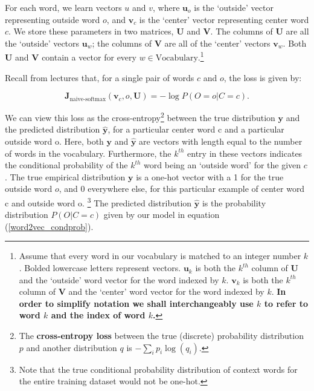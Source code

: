\documentclass{article}
\begin{document}
For each word, we learn vectors $u$ and $v$, where $\bm u_o$ is the `outside' vector representing outside word $o$, and $\bm v_c$ is the `center' vector representing center word $c$.
We store these parameters in two matrices, $\bm U$ and $\bm V$.
The columns of $\bm U$ are all the `outside' vectors $\bm u_{w}$;
the columns of $\bm V$ are all of the `center' vectors $\bm v_{w}$.
Both $\bm U$ and $\bm V$ contain a vector for every $w \in \text{Vocabulary}$.\footnote{Assume that every word in our vocabulary is matched to an integer number $k$. Bolded lowercase letters represent vectors. $\bm u_{k}$ is both the $k^{th}$ column of $\bm U$ and the `outside' word vector for the word indexed by $k$. $\bm v_k$ is both the $k^{th}$ column of $\bm V$ and the `center' word vector for the word indexed by $k$. \textbf{In order to simplify notation we shall interchangeably use $k$ to refer to word $k$ and the index of word $k$.}}\newline

Recall from lectures that, for a single pair of words $c$ and $o$, the loss is given by:

\begin{equation}
    \bm J_{\text{naive-softmax}}(\bm v_c, o, \bm U) = -\log P(O=o| C=c).
    \label{naive-softmax}
\end{equation}

We can view this loss as the cross-entropy\footnote{The \textbf{cross-entropy loss} between the true (discrete) probability distribution $p$ and another distribution $q$ is $-\sum_i p_i \log(q_i)$.} between the true distribution $\bm y$ and the predicted distribution $\hat{\bm y}$, for a particular center word c and a particular outside word o.
Here, both $\bm y$ and $\hat{\bm y}$ are vectors with length equal to the number of words in the vocabulary.
Furthermore, the $k^{th}$ entry in these vectors indicates the conditional probability of the $k^{th}$ word being an `outside word' for the given $c$.
The true empirical distribution $\bm y$ is a one-hot vector with a 1 for the true outside word $o$, and 0 everywhere else, for this particular example of center word c and outside word o. \footnote{Note that the true conditional probability distribution of context words for the entire training dataset would not be one-hot.}
The predicted distribution $\hat{\bm y}$ is the probability distribution $P(O|C=c)$ given by our model in equation (\ref{word2vec_condprob}). \newline
\end{document}
